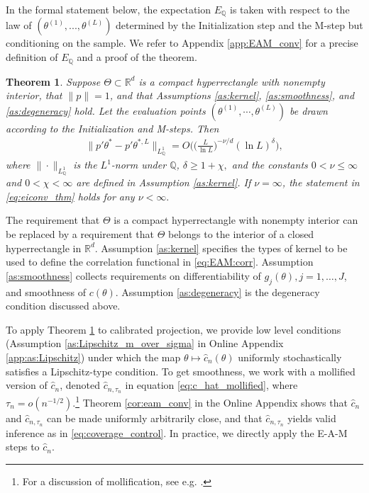 \documentclass[letterpaper,11pt]{article}
\theoremstyle{myplain}
\newtheorem{theorem}{Theorem}[section]
\theoremstyle{mydefinition}
\theoremstyle{myremark}
\renewcommand{\cite}{\citet}
\newcommand{\R}{\mathbb{R}}
\newcommand{\bQ}{\mathbb Q}
\numberwithin{equation}{section}
\numberwithin{figure}{section}
\begin{document}
In the formal statement below, the expectation $E_{\bQ}$ is taken with respect to the law of $(\theta^{(1)},...,\theta^{(L)})$ determined by the Initialization step and the M-step but conditioning on the sample. We refer to Appendix \ref{app:EAM_conv} for a precise definition of $E_{\bQ}$ and a proof of the theorem.
\begin{theorem}\label{thm:eiconv}
	Suppose $\Theta \subset \R^d$ is a compact hyperrectangle with nonempty interior, that $\|p\|=1$, and that Assumptions \ref{as:kernel}, \ref{as:smoothness}, and \ref{as:degeneracy} hold.
	Let the evaluation points $(\theta^{(1)},\cdots,\theta^{(L)})$ be drawn according to the Initialization and M-steps. Then
\begin{align}
\|p'\theta^*-p'\theta^{*,L}\|_{L^1_{\mathbb Q}}=O\Big(\Big(\frac{L}{\ln L}\Big)^{-\nu/d}(\ln L)^\delta\Big),\label{eq:eiconv_thm}
\end{align}
where $\|\cdot\|_{L^1_{\mathbb Q}}$ is the $L^1$-norm under $\mathbb Q$, $\delta\ge 1+\chi,$ and the constants $0<\nu\le \infty$ and $0<\chi<\infty$ are defined in Assumption \ref{as:kernel}. If $\nu=\infty$, the statement in \eqref{eq:eiconv_thm} holds for any $\nu<\infty.$
\end{theorem}
The requirement that $\Theta$ is a compact hyperrectangle with nonempty interior can be replaced by a requirement that $\Theta$ belongs to the interior of a closed hyperrectangle in $\R^d$. Assumption \ref{as:kernel} specifies the types of kernel to be used to define the correlation functional in \eqref{eq:EAM:corr}.
Assumption \ref{as:smoothness} collects requirements on differentiability of $g_j(\theta),j=1,\dots,J$, and smoothness of $c(\theta)$.
Assumption \ref{as:degeneracy} is the degeneracy condition discussed above.

To apply Theorem \ref{thm:eiconv} to calibrated projection, we provide low level conditions (Assumption \ref{as:Lipschitz_m_over_sigma} in Online Appendix \ref{app:as:Lipschitz}) under which the map $\theta \mapsto \hat c_n(\theta)$ uniformly stochastically satisfies a Lipschitz-type condition. To get smoothness, we work with a mollified version of $\hat{c}_n$, denoted $\hat c_{n,\tau_n}$ in equation \eqref{eq:c_hat_mollified}, where $\tau_n=o(n^{-1/2})$.\footnote{For a discussion of mollification, see e.g. \cite[Example 7.19]{Rockafellar_Wets2005aBK}.} Theorem \ref{cor:eam_conv} in the Online Appendix shows that $\hat c_n$ and $\hat c_{n,\tau_n}$ can be made uniformly arbitrarily close, and that $\hat c_{n,\tau_n}$ yields valid inference as in \eqref{eq:coverage_control}. In practice, we directly apply the E-A-M steps to $\hat c_n$.
\end{document}
